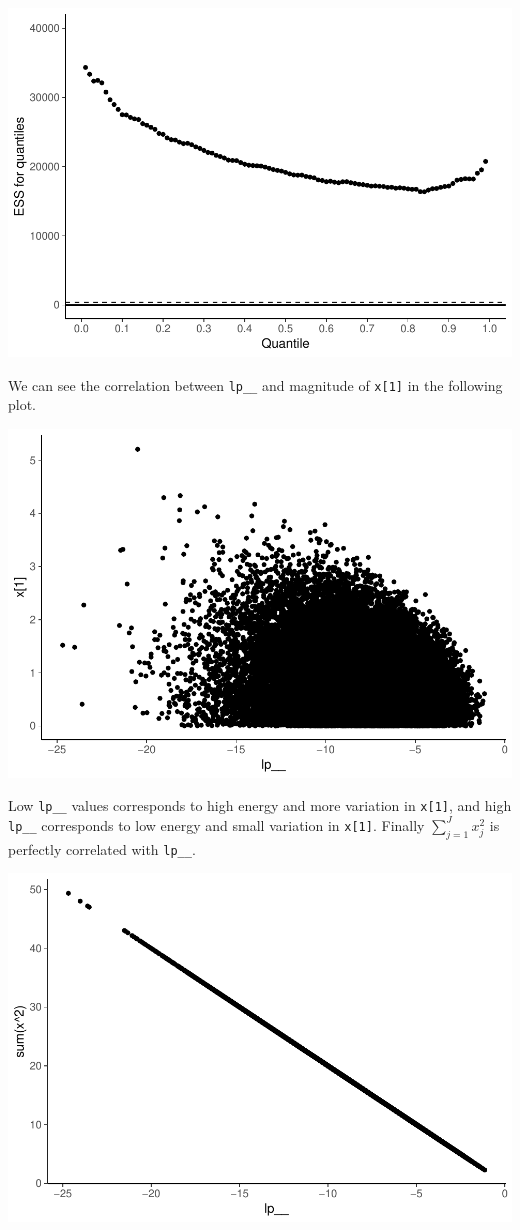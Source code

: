 \documentclass[american,]{article}
\begin{document}
\includegraphics{graphics/quantile-ess-fit-n-2-1.pdf}

We can see the correlation between \texttt{lp\_\_} and magnitude of
\texttt{x{[}1{]}} in the following plot.

\includegraphics{graphics/qplot-fit-n-1.pdf}

Low \texttt{lp\_\_} values corresponds to high energy and more variation
in \texttt{x{[}1{]}}, and high \texttt{lp\_\_} corresponds to low energy
and small variation in \texttt{x{[}1{]}}. Finally \(\sum_{j=1}^J x_j^2\)
is perfectly correlated with \texttt{lp\_\_}.

\includegraphics{graphics/qplot-fit-n-2-1.pdf}
\end{document}
